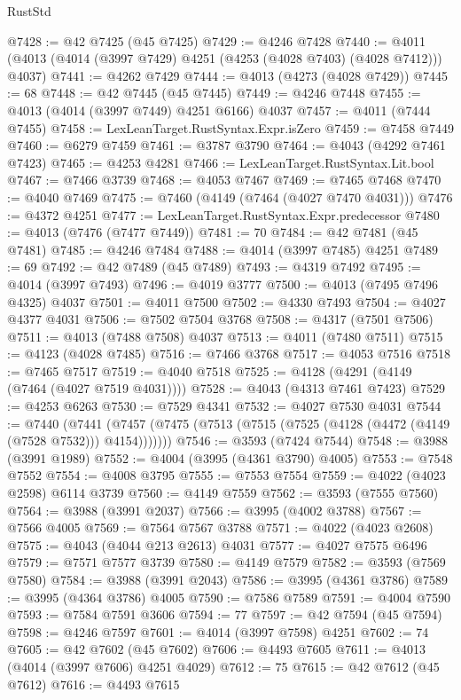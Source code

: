 \begin{lexlean}{RustStd}
\begin{coremodule}
@7428 := @42 @7425 (@45 @7425)
@7429 := @4246 @7428
@7440 := @4011 (@4013 (@4014 (@3997 @7429) @4251 (@4253 (@4028 @7403) (@4028 @7412))) @4037)
@7441 := @4262 @7429
@7444 := @4013 (@4273 (@4028 @7429))
@7445 := 68
@7448 := @42 @7445 (@45 @7445)
@7449 := @4246 @7448
@7455 := @4013 (@4014 (@3997 @7449) @4251 @6166) @4037
@7457 := @4011 (@7444 @7455)
@7458 := LexLeanTarget.RustSyntax.Expr.isZero
@7459 := @7458 @7449
@7460 := @6279 @7459
@7461 := @3787 @3790
@7464 := @4043 (@4292 @7461 @7423)
@7465 := @4253 @4281
@7466 := LexLeanTarget.RustSyntax.Lit.bool
@7467 := @7466 @3739
@7468 := @4053 @7467
@7469 := @7465 @7468
@7470 := @4040 @7469
@7475 := @7460 (@4149 (@7464 (@4027 @7470 @4031)))
@7476 := @4372 @4251
@7477 := LexLeanTarget.RustSyntax.Expr.predecessor
@7480 := @4013 (@7476 (@7477 @7449))
@7481 := 70
@7484 := @42 @7481 (@45 @7481)
@7485 := @4246 @7484
@7488 := @4014 (@3997 @7485) @4251
@7489 := 69
@7492 := @42 @7489 (@45 @7489)
@7493 := @4319 @7492
@7495 := @4014 (@3997 @7493)
@7496 := @4019 @3777
@7500 := @4013 (@7495 @7496 @4325) @4037
@7501 := @4011 @7500
@7502 := @4330 @7493
@7504 := @4027 @4377 @4031
@7506 := @7502 @7504 @3768
@7508 := @4317 (@7501 @7506)
@7511 := @4013 (@7488 @7508) @4037
@7513 := @4011 (@7480 @7511)
@7515 := @4123 (@4028 @7485)
@7516 := @7466 @3768
@7517 := @4053 @7516
@7518 := @7465 @7517
@7519 := @4040 @7518
@7525 := @4128 (@4291 (@4149 (@7464 (@4027 @7519 @4031))))
@7528 := @4043 (@4313 @7461 @7423)
@7529 := @4253 @6263
@7530 := @7529 @4341
@7532 := @4027 @7530 @4031
@7544 := @7440
    (@7441 (@7457 (@7475 (@7513 (@7515 (@7525 (@4128 (@4472 (@4149 (@7528 @7532))) @4154)))))))
@7546 := @3593 (@7424 @7544)
@7548 := @3988 (@3991 @1989)
@7552 := @4004 (@3995 (@4361 @3790) @4005)
@7553 := @7548 @7552
@7554 := @4008 @3795
@7555 := @7553 @7554
@7559 := @4022 (@4023 @2598) @6114 @3739
@7560 := @4149 @7559
@7562 := @3593 (@7555 @7560)
@7564 := @3988 (@3991 @2037)
@7566 := @3995 (@4002 @3788)
@7567 := @7566 @4005
@7569 := @7564 @7567 @3788
@7571 := @4022 (@4023 @2608)
@7575 := @4043 (@4044 @213 @2613) @4031
@7577 := @4027 @7575 @6496
@7579 := @7571 @7577 @3739
@7580 := @4149 @7579
@7582 := @3593 (@7569 @7580)
@7584 := @3988 (@3991 @2043)
@7586 := @3995 (@4361 @3786)
@7589 := @3995 (@4364 @3786) @4005
@7590 := @7586 @7589
@7591 := @4004 @7590
@7593 := @7584 @7591 @3606
@7594 := 77
@7597 := @42 @7594 (@45 @7594)
@7598 := @4246 @7597
@7601 := @4014 (@3997 @7598) @4251
@7602 := 74
@7605 := @42 @7602 (@45 @7602)
@7606 := @4493 @7605
@7611 := @4013 (@4014 (@3997 @7606) @4251 @4029)
@7612 := 75
@7615 := @42 @7612 (@45 @7612)
@7616 := @4493 @7615

\end{coremodule}
\end{lexlean}
